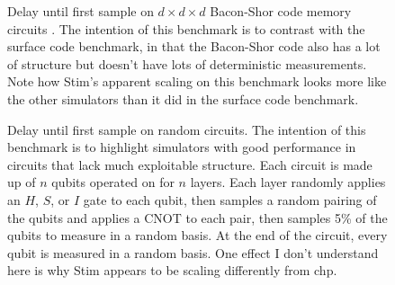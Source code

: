 \documentclass[onecolumn,unpublished]{quantumarticle}
\theoremstyle{definition}
\theoremstyle{definition}
\theoremstyle{definition}
\begin{document}
\begin{figure}
    \centering
    \caption{
        Delay until first sample on $d \times d \times d$ Bacon-Shor code memory circuits \cite{bacon2006operator}.
        The intention of this benchmark is to contrast with the surface code benchmark, in that the Bacon-Shor code also has a lot of structure but doesn't have lots of deterministic measurements.
        Note how Stim's apparent scaling on this benchmark looks more like the other simulators than it did in the surface code benchmark.
    }
    \label{fig:bench-bacon}
\end{figure}

\begin{figure}
    \centering
    \caption{
        Delay until first sample on random circuits.
        The intention of this benchmark is to highlight simulators with good performance in circuits that lack much exploitable structure.
        Each circuit is made up of $n$ qubits operated on for $n$ layers.
        Each layer randomly applies an $H$, $S$, or $I$ gate to each qubit, then samples a random pairing of the qubits and applies a CNOT to each pair, then samples 5\% of the qubits to measure in a random basis.
        At the end of the circuit, every qubit is measured in a random basis.
        One effect I don't understand here is why Stim appears to be scaling differently from chp.
    }
    \label{fig:bench-random}
\end{figure}
\end{document}
